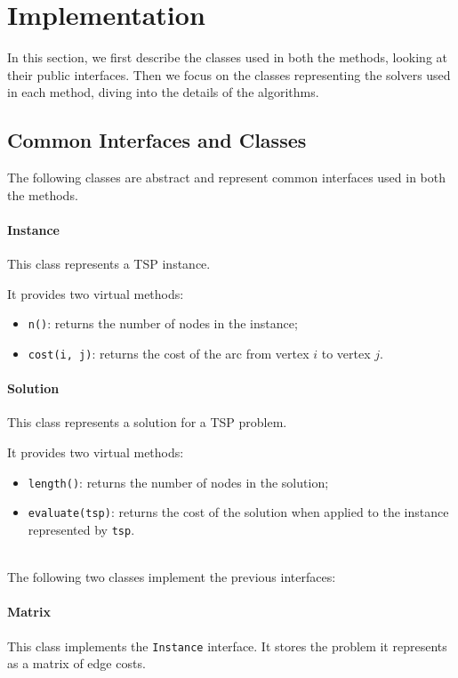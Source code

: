 \documentclass{article}
\begin{document}
\section{Implementation}

In this section, we first describe the classes used in both the methods, looking at their public interfaces.
Then we focus on the classes representing the solvers used in each method, diving into the details of the algorithms.

\subsection{Common Interfaces and Classes}
The following classes are abstract and represent common interfaces used in both the methods.

\paragraph{Instance}
This class represents a TSP instance.

It provides two virtual methods:
\begin{itemize}
    \item \texttt{n()}: returns the number of nodes in the instance;
    \item \texttt{cost(i, j)}: returns the cost of the arc from vertex $i$ to vertex $j$.
\end{itemize}

\paragraph{Solution}
This class represents a solution for a TSP problem.

It provides two virtual methods:
\begin{itemize}
    \item \texttt{length()}: returns the number of nodes in the solution;
    \item \texttt{evaluate(tsp)}: returns the cost of the solution when applied to the instance represented by \texttt{tsp}.
\end{itemize}

~\\
The following two classes implement the previous interfaces:

\paragraph{Matrix}
This class implements the \texttt{Instance} interface.
It stores the problem it represents as a matrix of edge costs.
\end{document}
